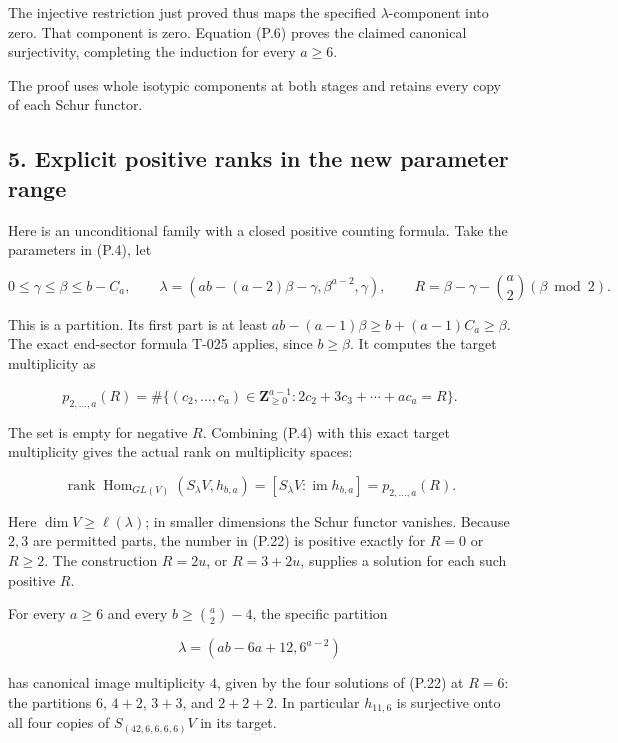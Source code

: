 \documentclass[
  10pt,
]{article}
\begin{document}
The injective restriction just proved thus maps the specified
\(\lambda\)-component into zero. That component is zero. Equation (P.6)
proves the claimed canonical surjectivity, completing the induction for
every \(a\ge6\).

The proof uses whole isotypic components at both stages and retains
every copy of each Schur functor.

\subsection{5. Explicit positive ranks in the new parameter
range}\label{explicit-positive-ranks-in-the-new-parameter-range}

Here is an unconditional family with a closed positive counting formula.
Take the parameters in (P.4), let

\[
0\le\gamma\le\beta\le b-C_a,\qquad
\lambda=(ab-(a-2)\beta-\gamma,\beta^{a-2},\gamma),
\qquad
R=\beta-\gamma-\binom a2(\beta\bmod2).
\tag{P.21}
\]

This is a partition. Its first part is at least
\(ab-(a-1)\beta\ge b+(a-1)C_a\ge\beta\). The exact end-sector formula
T-025 applies, since \(b\ge\beta\). It computes the target multiplicity
as

\[
p_{2,\ldots,a}(R)
=\#\{(c_2,\ldots,c_a)\in\mathbf Z_{\ge0}^{a-1}:
             2c_2+3c_3+\cdots+ac_a=R\}.
\tag{P.22}
\]

The set is empty for negative \(R\). Combining (P.4) with this exact
target multiplicity gives the actual rank on multiplicity spaces:

\[
\boxed{
\operatorname{rank}\operatorname{Hom}_{GL(V)}(S_\lambda V,h_{b,a})
=[S_\lambda V:\operatorname{im}h_{b,a}]
=p_{2,\ldots,a}(R).}
\tag{P.23}
\]

Here \(\dim V\ge\ell(\lambda)\); in smaller dimensions the Schur functor
vanishes. Because \(2,3\) are permitted parts, the number in (P.22) is
positive exactly for \(R=0\) or \(R\ge2\). The construction \(R=2u\), or
\(R=3+2u\), supplies a solution for each such positive \(R\).

For every \(a\ge6\) and every \(b\ge\binom a2-4\), the specific
partition

\[
\lambda=(ab-6a+12,6^{a-2})
\tag{P.24}
\]

has canonical image multiplicity \(4\), given by the four solutions of
(P.22) at \(R=6\): the partitions \(6\), \(4+2\), \(3+3\), and
\(2+2+2\). In particular \(h_{11,6}\) is surjective onto all four copies
of \(S_{(42,6,6,6,6)}V\) in its target.
\end{document}
